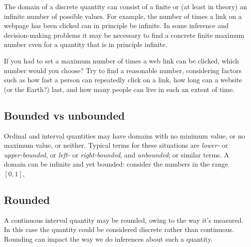 \documentclass[
  a4paper,
  DIV=11,
  numbers=noendperiod,
  oneside]{scrreprt}
\begin{document}
The domain of a discrete quantity can consist of a finite or (at least
in theory) an infinite number of possible values. For example, the
number of times a link on a webpage has been clicked can in principle be
infinite. In some inference and decision-making problems it may be
necessary to find a concrete finite maximum number even for a quantity
that is in principle infinite.

\begin{tcolorbox}[enhanced jigsaw, rightrule=.15mm, bottomtitle=1mm, leftrule=.75mm, toprule=.15mm, colframe=quarto-callout-caution-color-frame, coltitle=black, titlerule=0mm, bottomrule=.15mm, opacitybacktitle=0.6, title={\faIcon{user-edit} Exercises}, arc=.35mm, toptitle=1mm, colback=white, opacityback=0, colbacktitle=quarto-callout-caution-color!10!white, breakable, left=2mm]

If you had to set a maximum number of times a web link can be clicked,
which number would you choose? Try to find a reasonable number,
considering factors such as how fast a person can repeatedly click on a
link, how long can a website (or the Earth?) last, and how many people
can live in such an extent of time.

\end{tcolorbox}

\hypertarget{bounded-vs-unbounded}{%
\subsection{Bounded vs unbounded}\label{bounded-vs-unbounded}}

Ordinal and interval quantities may have domains with no minimum value,
or no maximum value, or neither. Typical terms for these situations are
\emph{lower-} or \emph{upper-bounded}, or \emph{left-} or
\emph{right-bounded}, and \emph{unbounded}; or similar terms. A domain
can be infinite and yet bounded: consider the numbers in the range
\([0,1]\),

\hypertarget{rounded}{%
\subsection{Rounded}\label{rounded}}

A continuous interval quantity may be rounded, owing to the way it's
measured. In this case the quantity could be considered discrete rather
than continuous. Rounding can impact the way we do inferences about such
a quantity.
\end{document}

